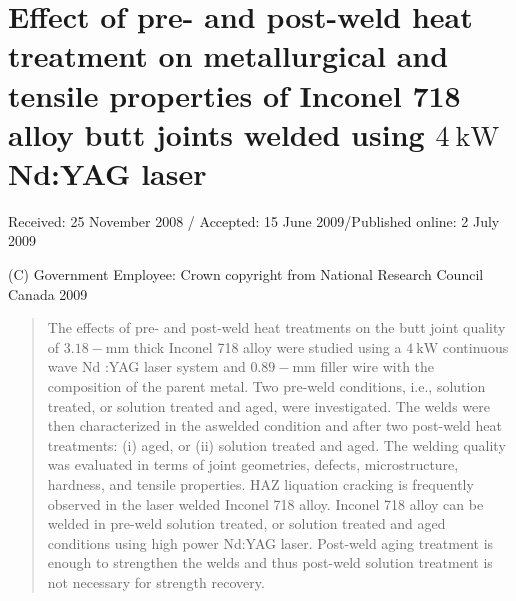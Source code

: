 \documentclass[10pt]{article}
\begin{document}
\section*{Effect of pre- and post-weld heat treatment on metallurgical and tensile properties of Inconel 718 alloy butt joints welded using $4 \mathrm{~kW}$ Nd:YAG laser }
Received: 25 November 2008 / Accepted: 15 June 2009/Published online: 2 July 2009

(C) Government Employee: Crown copyright from National Research Council Canada 2009

\begin{abstract}
The effects of pre- and post-weld heat treatments on the butt joint quality of $3.18-\mathrm{mm}$ thick Inconel 718 alloy were studied using a $4 \mathrm{~kW}$ continuous wave $\mathrm{Nd}$ :YAG laser system and $0.89-\mathrm{mm}$ filler wire with the composition of the parent metal. Two pre-weld conditions, i.e., solution treated, or solution treated and aged, were investigated. The welds were then characterized in the aswelded condition and after two post-weld heat treatments: (i) aged, or (ii) solution treated and aged. The welding quality was evaluated in terms of joint geometries, defects, microstructure, hardness, and tensile properties. HAZ liquation cracking is frequently observed in the laser welded Inconel 718 alloy. Inconel 718 alloy can be welded in pre-weld solution treated, or solution treated and aged conditions using high power Nd:YAG laser. Post-weld aging treatment is enough to strengthen the welds and thus post-weld solution treatment is not necessary for strength recovery.
\end{abstract}
\end{document}
